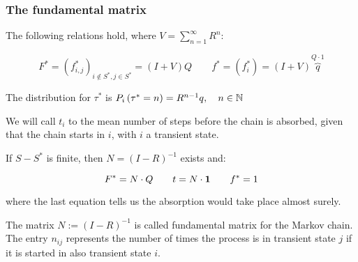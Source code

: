  \begin{frame} \frametitle{The fundamental matrix}
    \vspace{2em}
    
    \begin{proposition}
    The following relations hold, where $V = \sum_{n = 1}^{\infty} R^n$:

    \[
    F^{\ast} = (f_{i,j}^{\ast})_{i \not\in S^{\ast}, j \in S^{\ast}} = (I + V)Q \qquad
    f^{\ast} = (f_{i}^{\ast}) = (I + V) \overbrace{q}^{Q \cdot 1 }
    \]

    The distribution for \(\tau^{\ast}\) is \(P_i\left({\tau^{\ast} = n}\right) = R^{n - 1}q, \quad n \in \mathbb{N}\)
    \end{proposition}

    \begin{definition}
    We will call \(t_i\) to the mean number of steps before the chain is absorbed, given that 
    the chain starts in \(i\), with \(i\) a transient state.
    \end{definition}
    
    \begin{proposition}
    If \(S - S^{\ast}\) is finite, then \(N = (I - R)^{-1}\) exists and:

    \[
    F^{\ast} = N\cdot Q \qquad 
    t = N \cdot \mathbf{1} \qquad
    f^{\ast} = 1
    \]

    where the last equation tells us the absorption would take place almost surely.
    \end{proposition}
    
    \begin{definition}
    The matrix \(N := (I - R)^{-1}\) is called fundamental matrix for the Markov chain. 
    The entry \(n_{ij}\) represents the number of times the process is in transient state \(j\) 
    if it is started in also transient state \(i\).
    \end{definition}
  
 \end{frame}



